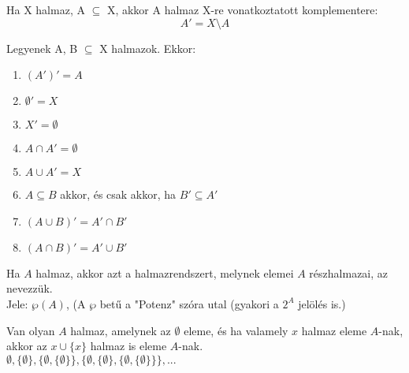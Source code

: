 \begin{frame}
  \begin{tcolorbox}[title={Definíció: Komplementer}]
    Ha X halmaz, A $\subseteq$ X, akkor A halmaz X-re vonatkoztatott komplementere:\\
    $$A' = X \setminus A$$
  \end{tcolorbox}

  \begin{tcolorbox}[title={Tétel: A komplementer tulajdonságai}]
    Legyenek A, B $\subseteq$ X halmazok. Ekkor:

    \begin{enumerate}
      \item $(A')' = A$
      \item $\emptyset' = X$
      \item $X' = \emptyset$
      \item $A \cap A' = \emptyset$
      \item $A \cup A' = X$
      \item $A \subseteq B$ akkor, és csak akkor, ha $B' \subseteq A'$      
      \item $(A \cup B)' = A' \cap B'$
      \item $(A \cap B)' = A' \cup B'$
    \end{enumerate}
  \end{tcolorbox}
\end{frame}

\begin{frame}
  \begin{tcolorbox}[title={Definíció: Hatványhalmaz}]
    Ha $A$ halmaz, akkor azt a halmazrendszert, melynek elemei $A$ részhalmazai, az  nevezzük.\\
    Jele: ${\wp}(A)$, (A $\wp$ betű a "Potenz" szóra utal (gyakori a $2^A$ jelölés is.)
  \end{tcolorbox}

  \begin{tcolorbox}[title={Axióma: Végtelenségi Axióma}]
    Van olyan $A$ halmaz, amelynek az $\emptyset$ eleme, és ha valamely $x$ halmaz eleme $A$-nak, akkor az $x \cup \{ x \}$ halmaz is eleme $A$-nak.\\
    $\emptyset, \{ \emptyset \}, \{ \emptyset, \{ \emptyset \} \}, \{ \emptyset , \{ \emptyset \}, \{ \emptyset , \{ \emptyset \} \} \}, ...$
  \end{tcolorbox}
\end{frame}



